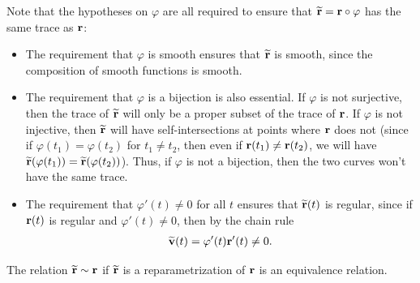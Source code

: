 \documentclass[12pt,letterpaper,reqno]{article}
\numberwithin{equation}{section}
\newcommand{\bv}{{\bf v}}
\newcommand{\bbr}{{\bf r}}
\begin{document}
{\begin{remark}
Note that the hypotheses on $\varphi$ are all required to ensure that $\widetilde{\bbr}=\bbr \circ \varphi$ has the same trace as $\bbr$:
\begin{itemize}
	\item The requirement that $\varphi$ is smooth ensures that $\widetilde{\bbr}$ is smooth, since the composition of smooth functions is smooth.
	\item The requirement that $\varphi$ is a bijection is also essential. If $\varphi$ is not surjective, then the trace of $\widetilde{\bbr}$ will only be a proper subset of the trace of $\bbr$. If $\varphi$ is not injective, then $\widetilde{\bbr}$ will have self-intersections at points where $\bbr$ does not (since if $\varphi(t_1)=\varphi(t_2)$ for $t_1 \neq t_2$, then even if $\bbr(t_1) \neq \bbr(t_2)$, we will have $\widetilde{\bbr}(\varphi(t_1))=\widetilde{\bbr}(\varphi(t_2))$). Thus, if $\varphi$ is not a bijection, then the two curves won't have the same trace.
	\item The requirement that $\varphi'(t) \neq 0$ for all $t$ ensures that $\widetilde{\bbr}(t)$ is regular, since if $\bbr(t)$ is regular and $\varphi'(t) \neq 0$, then by the chain rule
	\begin{align*}
		\widetilde{\bv}(t)=\varphi'(t)\bbr'(t) \neq 0.
	\end{align*}
\end{itemize}
\end{remark}

\begin{prop}
The relation $\widetilde{\bbr} \sim \bbr$ if $\widetilde{\bbr}$ is a reparametrization of $\bbr$ is an equivalence relation. 	
\end{prop}

}
\end{document}
